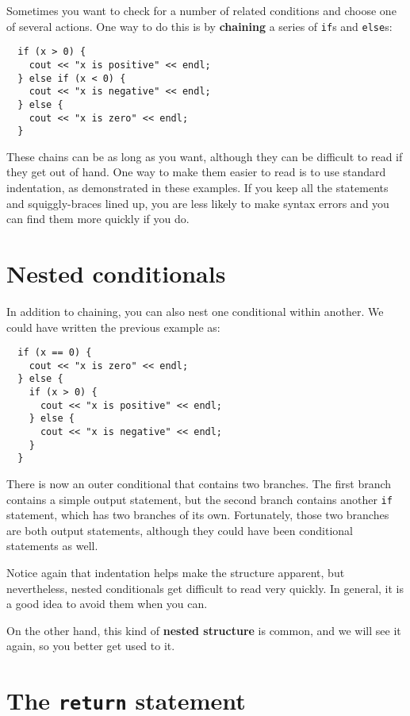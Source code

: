 Sometimes you want to check for a number of related conditions
and choose one of several actions.  One way to do this is by
{\bf chaining} a series of {\tt if}s and {\tt else}s:

\begin{verbatim}
  if (x > 0) {
    cout << "x is positive" << endl;
  } else if (x < 0) {
    cout << "x is negative" << endl;
  } else {
    cout << "x is zero" << endl;
  }
\end{verbatim}
%
These chains can be as long as you want, although they can
be difficult to read if they get out of hand.  One way to
make them easier to read is to use standard indentation,
as demonstrated in these examples.  If you keep all the
statements and squiggly-braces lined up, you are less
likely to make syntax errors and you can find them more
quickly if you do.

\section{Nested conditionals}

In addition to chaining, you can also nest one conditional
within another.  We could have written the previous example
as:

\begin{verbatim}
  if (x == 0) {
    cout << "x is zero" << endl;
  } else {
    if (x > 0) {
      cout << "x is positive" << endl;
    } else {
      cout << "x is negative" << endl;
    }
  }
\end{verbatim}
%
There is now an outer conditional that contains two branches.  The
first branch contains a simple output statement, but the second
branch contains another {\tt if} statement, which has two branches
of its own.  Fortunately, those two branches are both output
statements, although they could have been conditional statements as
well.

Notice again that indentation helps make the structure
apparent, but nevertheless, nested conditionals get difficult to read
very quickly.  In general, it is a good idea to avoid them when you
can.


On the other hand, this kind of {\bf nested structure} is common, and
we will see it again, so you better get used to it.

\section{The {\tt return} statement}

